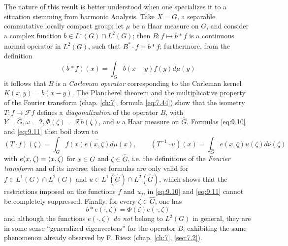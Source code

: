 \documentclass[12pt,a4paper,leqno,twoside]{extbook}
\DeclarePairedDelimiter{\ip}{\langle}{\rangle}
\begin{document}
The nature of this result is better understood when one specializes it to a situation stemming from harmonic Analysis. Take \(X = G\), a separable commutative locally compact group; let \(\mu\) be a Haar measure on \(G\), and consider a complex function \(b \in L^1(G) \cap L^2(G)\); then \(B: f \mapsto b * f\) is a continuous normal operator in \(L^2(G)\), such that \(B^* \cdot f = \check{\overline{b}} * f\); furthermore, from the definition
\[
    (b * f)(x) = \int_G b(x-y) f(y) d\mu(y)
\]
it follows that \(B\) is a \emph{Carleman operator} corresponding to the Carleman kernel \(K(x,y) = b(x-y)\). The Plancherel theorem and the multiplicative property of the Fourier transform (chap. \ref{ch:7}, formula \eqref{eq:7.44}) show that the isometry \(T: f \mapsto \mathcal{F}f\) defines a \emph{diagonalization} of the operator \(B\), with \(Y = \hat{G}, \omega = 2, \Phi(\zeta) = \mathcal{F}b(\zeta)\), and \(\nu\) a Haar measure on \(\hat{G}\). Formulas \eqref{eq:9.10} and \eqref{eq:9.11} then boil down to
\begin{equation}
    \label{eq:9.12}
    (T \cdot f)(\zeta) = \int_G f(x) \overline{e(x, \zeta)} d\mu(x),
    \qquad
    (T^{-1} \cdot u)(x) = \int_{\hat{G}} e(x, \zeta) u(\zeta) d\nu(\zeta)
\end{equation}
with \(e(x,\zeta) = \ip{x, \zeta}\) for \(x \in G\) and \(\zeta \in \hat{G}\), i.e. the definitions of the \emph{Fourier transform} and of its inverse; these formulas are only valid for \(f \in L^1(G) \cap L^2(G)\) and \(u \in L^1(\hat{G}) \cap L^2(\hat{G})\), which shows that the restrictions imposed on the functions \(f\) and \(u_j\), in \eqref{eq:9.10} and \eqref{eq:9.11} cannot be completely suppressed. Finally, for every \(\zeta \in \hat{G}\), one has
\begin{equation}
    \label{eq:9.13}
    b * e (\cdot, \zeta) = \Phi(\zeta) e(\cdot, \zeta)
\end{equation}
and although the functions \(e(\cdot, \zeta)\) \emph{do not} belong to \(L^2(G)\) in general, they are in some sense ``generalized eigenvectors'' for the operator \(B\), exhibiting the same phenomenon already observed by F. Riesz (chap. \ref{ch:7}, \ref{sec:7.2}).
\end{document}
